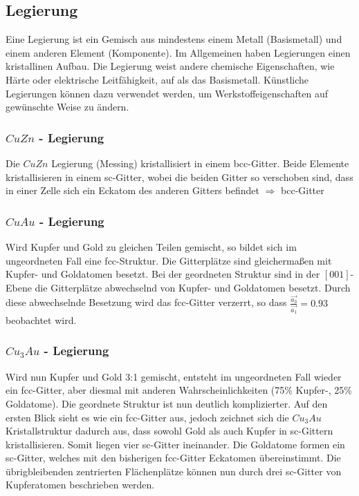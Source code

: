         \subsection{Legierung}
            Eine Legierung ist ein Gemisch aus mindestens einem Metall (Basismetall) und einem anderen Element (Komponente). Im Allgemeinen 
            haben Legierungen einen kristallinen Aufbau. Die Legierung weist andere chemische Eigenschaften, wie Härte oder elektrische Leitfähigkeit,
            auf als das Basismetall. Künstliche Legierungen können dazu verwendet werden, um Werkstoffeigenschaften auf gewünschte Weise zu ändern.
        \subsubsection{$CuZn$ - Legierung}
            Die $CuZn$ Legierung (Messing) kristallisiert in einem bcc-Gitter. Beide Elemente kristallisieren in einem sc-Gitter,
            wobei die beiden Gitter so verschoben sind, dass in einer Zelle sich ein Eckatom des anderen Gitters befindet $\Rightarrow$ bcc-Gitter 
            
        \subsubsection{$CuAu$ - Legierung}
            Wird Kupfer und Gold zu gleichen Teilen gemischt, so bildet sich im ungeordneten Fall eine fcc-Struktur. Die Gitterplätze sind gleichermaßen
            mit Kupfer- und Goldatomen besetzt. Bei der geordneten Struktur sind in der $[001]$-Ebene die Gitterplätze abwechselnd von Kupfer- und Goldatomen besetzt.
            Durch diese abwechselnde Besetzung wird das fcc-Gitter verzerrt, so dass $\frac{\vec{a_3}}{\vec{a_1}} = 0.93$ beobachtet wird.

        \subsubsection{$Cu_3Au$ - Legierung}
            Wird nun Kupfer und Gold 3:1 gemischt, entsteht im ungeordneten Fall wieder ein fcc-Gitter, aber diesmal mit anderen Wahrscheinlichkeiten
            (75\% Kupfer-, 25\% Goldatome). Die geordnete Struktur ist nun deutlich komplizierter. Auf den ersten Blick sieht es wie ein fcc-Gitter aus, 
            jedoch zeichnet sich die $Cu_3Au$ Kristallstruktur dadurch aus, dass sowohl Gold als auch Kupfer in sc-Gittern kristallisieren. Somit liegen 
            vier sc-Gitter ineinander. Die Goldatome formen ein sc-Gitter, welches mit den bisherigen fcc-Gitter Eckatomen übereinstimmt.
            Die übrigbleibenden zentrierten Flächenplätze können nun durch  drei sc-Gitter von Kupferatomen beschrieben werden.
